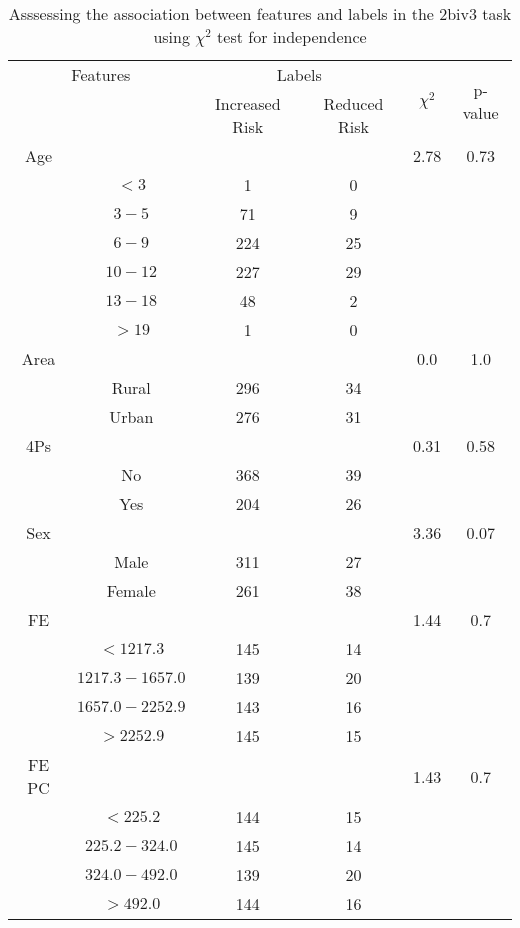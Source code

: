 \begin{table}[!htb]
\centering
\caption{Asssessing the association between features and labels in the 2biv3 task using $\chi^2$ test for independence}
\label{tab:chitest_2biv3}
\begin{tabular}{c c | c c| c | c}
\hline
\multicolumn{2}{c|}{Features}& \multicolumn{2}{c|}{Labels}& \multirow{2}{*}{$\chi^2$} & \multirow{2}{*}{p-value}\\ 
& & Increased Risk & Reduced Risk & & \\ 
\hline
Age &  &  & & 2.78 & 0.73 \\ 
& $< 3$ & 1 & 0& & \\ 
& $3-5$ & 71 & 9& & \\ 
& $6-9$ & 224 & 25& & \\ 
& $10-12$ & 227 & 29& & \\ 
& $13-18$ & 48 & 2& & \\ 
& $> 19$ & 1 & 0& & \\ 
\hline 
Area &  &  & & 0.0 & 1.0 \\ 
& Rural & 296 & 34& & \\ 
& Urban & 276 & 31& & \\ 
\hline 
4Ps &  &  & & 0.31 & 0.58 \\ 
& No & 368 & 39& & \\ 
& Yes & 204 & 26& & \\ 
\hline 
Sex &  &  & & 3.36 & 0.07 \\ 
& Male & 311 & 27& & \\ 
& Female & 261 & 38& & \\ 
\hline 
FE &  &  & & 1.44 & 0.7 \\ 
& $< 1217.3$ & 145 & 14& & \\ 
& $1217.3-1657.0$ & 139 & 20& & \\ 
& $1657.0-2252.9$ & 143 & 16& & \\ 
& $> 2252.9$ & 145 & 15& & \\ 
\hline 
FE PC &  &  & & 1.43 & 0.7 \\ 
& $< 225.2$ & 144 & 15& & \\ 
& $225.2-324.0$ & 145 & 14& & \\ 
& $324.0-492.0$ & 139 & 20& & \\ 
& $> 492.0$ & 144 & 16& & \\ 
\hline 
\end{tabular}
\end{table}

